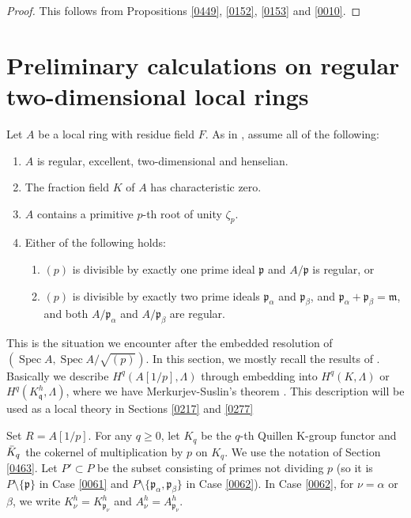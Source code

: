 \documentclass{amsart}
\theoremstyle{remark}
\numberwithin{equation}{subsection}
\newcommand{\ideal}[1]{\mathfrak{#1}}
\DeclareMathOperator{\Spec}{Spec}
\begin{document}
\begin{proof}
	This follows from Propositions \ref{0449}, \ref{0152}, \ref{0153} and \ref{0010}.
\end{proof}


\section{Preliminary calculations on regular two-dimensional local rings}
\label{0060}

Let $A$ be a local ring with residue field $F$.
As in \cite[\S 4]{Sai86}, assume all of the following:
\begin{enumerate}
	\item \label{0202}
		$A$ is regular, excellent, two-dimensional and henselian.
	\item \label{0203}
		The fraction field $K$ of $A$ has characteristic zero.
	\item \label{0205}
		$A$ contains a primitive $p$-th root of unity $\zeta_{p}$.
	\item \label{0206}
		Either of the following holds:
		\begin{enumerate}
			\item \label{0061}
				$(p)$ is divisible by exactly one prime ideal $\ideal{p}$
				and $A / \ideal{p}$ is regular, or
			\item \label{0062}
				$(p)$ is divisible by exactly two prime ideals
				$\ideal{p}_{\alpha}$ and $\ideal{p}_{\beta}$,
				and $\ideal{p}_{\alpha} + \ideal{p}_{\beta} = \ideal{m}$,
				and both $A / \ideal{p}_{\alpha}$ and $A / \ideal{p}_{\beta}$ are regular.
		\end{enumerate}
\end{enumerate}
This is the situation we encounter after the embedded resolution
of $(\Spec A, \Spec A / \sqrt{(p)})$.
In this section, we mostly recall the results of \cite[\S 4]{Sai86}.
Basically we describe $H^{q}(A[1 / p], \Lambda)$ through
embedding into $H^{q}(K, \Lambda)$ or $H^{q}(K_{\ideal{q}}^{h}, \Lambda)$,
where we have Merkurjev-Suslin's theorem \cite{MS82}.
This description will be used as a local theory in Sections \ref{0217} and \ref{0277}

Set $R = A[1 / p]$.
For any $q \ge 0$, let $K_{q}$ be the $q$-th Quillen K-group functor
and $\Bar{K}_{q}$ the cokernel of multiplication by $p$ on $K_{q}$.
We use the notation of Section \ref{0463}.
Let $P' \subset P$ be the subset consisting of primes not dividing $p$
(so it is $P \setminus \{\ideal{p}\}$ in Case \eqref{0061}
and $P \setminus \{\ideal{p}_{\alpha}, \ideal{p}_{\beta}\}$ in Case \eqref{0062}).
In Case \eqref{0062}, for $\nu = \alpha$ or $\beta$,
we write $K_{\nu}^{h} = K_{\ideal{p}_{\nu}}^{h}$ and
$A_{\nu}^{h} = A_{\ideal{p}_{\nu}}^{h}$.
\end{document}
